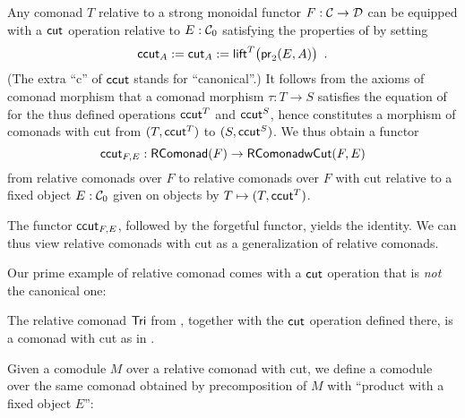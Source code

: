 \documentclass{amsart}
\begin{document}
\begin{remark}\label{canonical_cut}
 Any comonad $T$ relative to a strong monoidal functor $F:{\mathcal{C}}\to\mathcal{D}$  can be equipped with a $\mathsf{cut}$ operation relative to 
 $E:{\mathcal{C}}_0$ satisfying the properties of  by setting
   \[ \mathsf{ccut}_A := \mathsf{cut}_A := \mathsf{lift}^T\bigl(\mathsf{pr}_2(E,A)\bigr) \enspace . \]
 (The extra \enquote{c} of $\mathsf{ccut}$ stands for \enquote{canonical}.)
 It follows from the axioms of comonad morphism that a comonad morphism $\tau : T\to S$ satisfies the equation of  
 for the thus defined operations $\mathsf{ccut}^T$ and $\mathsf{ccut}^S$, hence constitutes a morphism of comonads with cut from $(T,\mathsf{ccut}^T)$ to $(S,\mathsf{ccut}^S)$.
 We thus obtain a functor 
 \[ \mathsf{ccut}_{F,E} : \mathsf{RComonad}(F) \to \mathsf{\mathsf{RComonad} wCut}(F,E)\]
 from relative comonads over $F$ to relative comonads over $F$ with cut relative to a fixed object $E:{\mathcal{C}}_0$ given on 
 objects by $T\mapsto (T,\mathsf{ccut}^T)$.
\end{remark}

The functor $\mathsf{ccut}_{F,E}$, followed by the forgetful functor, yields the identity. We can thus view
relative comonads with cut as a generalization of relative comonads.


Our prime example of relative comonad comes with a $\mathsf{cut}$ operation that is \emph{not} the canonical one:

\begin{example}\label{def:cut_for_tri}
  The relative comonad $\mathsf{Tri}$ from , together with the $\mathsf{cut}$ operation defined there, 
  is a comonad with cut as in .
\end{example}





Given a comodule $M$ over a relative comonad with cut, we define a comodule over the same comonad obtained by precomposition of $M$ with
\enquote{product with a fixed object $E$}:
\end{document}
